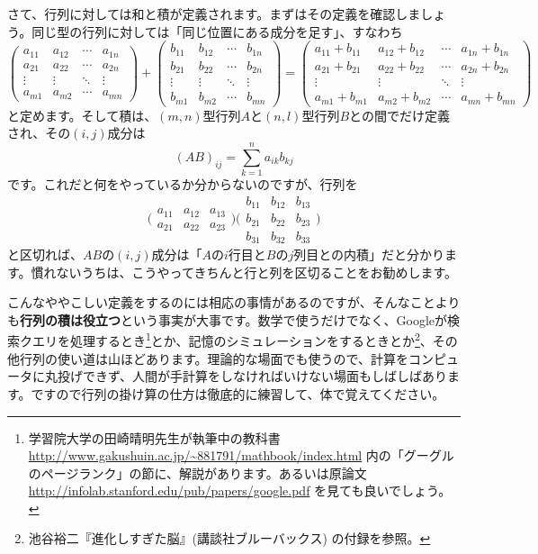 さて、行列に対しては和と積が定義されます。まずはその定義を確認しましょう。同じ型の行列に対しては「同じ位置にある成分を足す」、すなわち
\[
\begin{pmatrix}
a_{11} & a_{12} & \cdots & a_{1n} \\
a_{21} & a_{22} & \cdots & a_{2n} \\
\vdots & \vdots & \ddots & \vdots \\
a_{m1} & a_{m2} & \cdots & a_{mn}
\end{pmatrix}
+
\begin{pmatrix}
b_{11} & b_{12} & \cdots & b_{1n} \\
b_{21} & b_{22} & \cdots & b_{2n} \\
\vdots & \vdots & \ddots & \vdots \\
b_{m1} & b_{m2} & \cdots & b_{mn}
\end{pmatrix}
=
\begin{pmatrix}
a_{11} + b_{11} & a_{12} + b_{12} & \cdots & a_{1n} + b_{1n} \\
a_{21} + b_{21} & a_{22} + b_{22} & \cdots & a_{2n} + b_{2n} \\
\vdots & \vdots & \ddots & \vdots \\
a_{m1} + b_{m1} & a_{m2} + b_{m2} & \cdots & a_{mn} + b_{mn}
\end{pmatrix}
\]
と定めます。そして積は、$(m,n)$型行列$A$と$(n,l)$型行列$B$との間でだけ定義され、その$(i,j)$成分は
\[
(AB)_{ij} = \sum_{k = 1}^n a_{ik}b_{kj}
\]
です。これだと何をやっているか分からないのですが、行列を
\[
\biggl(
\begin{array}{ccc}
a_{11} & a_{12} & a_{13} \\ \hline
a_{21} & a_{22} & a_{23} 
\end{array}
\biggr)
\Biggl(
\begin{array}{c|c|c}
b_{11} & b_{12} & b_{13} \\
b_{21} & b_{22} & b_{23} \\
b_{31} & b_{32} & b_{33}
\end{array}
\Biggr)
\]
と区切れば、$AB$の$(i,j)$成分は「$A$の$i$行目と$B$の$j$列目との内積」だと分かります。慣れないうちは、こうやってきちんと行と列を区切ることをお勧めします。

こんなややこしい定義をするのには相応の事情があるのですが、そんなことよりも\textbf{行列の積は役立つ}という事実が大事です。数学で使うだけでなく、Googleが検索クエリを処理するとき\footnote{学習院大学の田崎晴明先生が執筆中の教科書 \url{http://www.gakushuin.ac.jp/~881791/mathbook/index.html} 内の「グーグルのページランク」の節に、解説があります。あるいは原論文 \url{http://infolab.stanford.edu/pub/papers/google.pdf} を見ても良いでしょう。}とか、記憶のシミュレーションをするときとか\footnote{池谷裕二『進化しすぎた脳』(講談社ブルーバックス) の付録を参照。}、その他行列の使い道は山ほどあります。理論的な場面でも使うので、計算をコンピュータに丸投げできず、人間が手計算をしなければいけない場面もしばしばあります。ですので行列の掛け算の仕方は徹底的に練習して、体で覚えてください。

